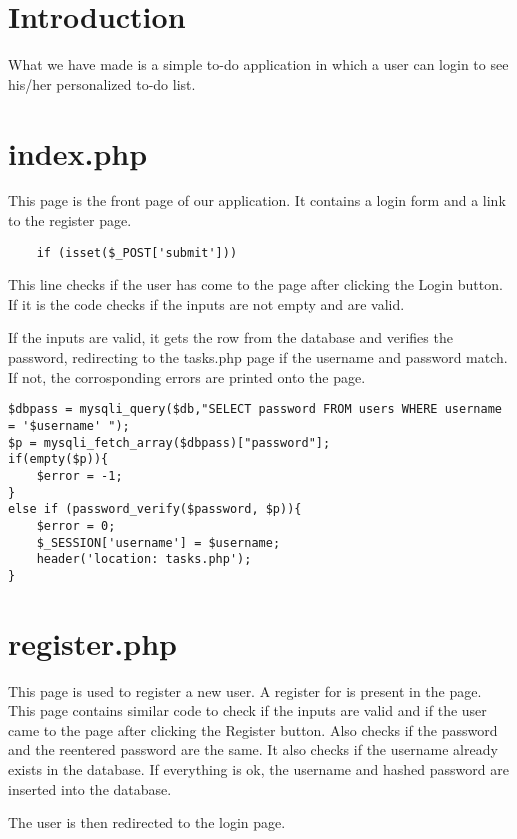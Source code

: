 \documentclass[10pt,a4paper,titlepage]{report}
\begin{document}
\section{Introduction}
\par What we have made is a simple to-do application in which a user can login to see his/her personalized to-do list. 

\section{index.php}
\par This page is the front page of our application. It contains a login form and a link to the register page.

\begin{verbatim}
	if (isset($_POST['submit']))
\end{verbatim}

\par This line checks if the user has come to the page after clicking the Login button. If it is the code checks if the inputs are not empty and are valid. 

\par If the inputs are valid, it gets the row from the database and verifies the password, redirecting to the {\color{red}tasks.php} page if the username and password match. If not, the corrosponding errors are printed onto the page.

\begin{verbatim}
$dbpass = mysqli_query($db,"SELECT password FROM users WHERE username = '$username' ");
$p = mysqli_fetch_array($dbpass)["password"];
if(empty($p)){
	$error = -1;
}
else if (password_verify($password, $p)){
	$error = 0;
	$_SESSION['username'] = $username;
	header('location: tasks.php');
}
\end{verbatim}

\section{register.php}
\par This page is used to register a new user. A register for is present in the page. This page contains similar code to check if the inputs are valid and if the user came to the page after clicking the Register button. Also checks if the password and the reentered password are the same. It also checks if the username already exists in the database. If everything is ok, the username and hashed password are inserted into the database. 
\par The user is then redirected to the login page.
\end{document}
